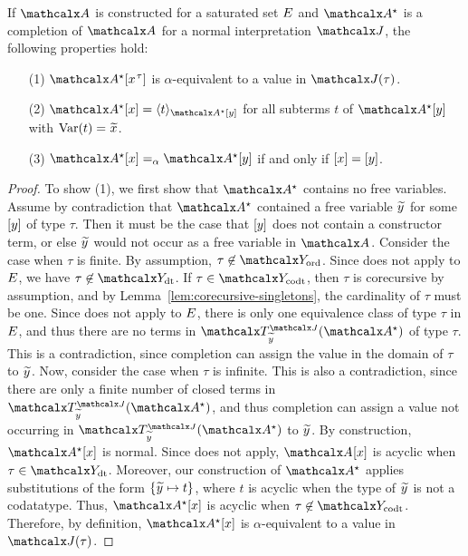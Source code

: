 \begin{lemma}
\label{lem:interpretation-completion}
If $\Val$ is constructed for a saturated set $E$
and $\ValC$ is a completion of $\Val$ for a normal interpretation $\J$, the following properties hold:
\begin{enumerate}
\item[\rm (1)] $\ValC \ec{x\typ{\tau}}$ is $\alpha$-equivalent to a value in $\J( \tau )$.
\item[\rm (2)]
$\ValC \ec{x} = \interp{\ValC \ec{y}}{ t }$ for
all subterms $t$ of $\ValC \ec{y}$ with $\muvar(t) = {\Varec{x}}$.
\item[\rm (3)]
$\ValC \ec{x} \vsim \ValC \ec{y}$ if and only if $[x] = [y]$.
\end{enumerate}
\end{lemma}
\begin{rep}
\begin{proof}
To show (1), we first show that $\ValC$ contains no free variables.
Assume by contradiction that $\ValC$ contained a free variable ${\Varec{y}}$ for some $[y]$ of type $\tau$.
Then it must be the case that $[y]$ does not contain a constructor term,
or else ${\Varec{y}}$ would not occur as a free variable in $\Val$.
Consider the case when $\tau$ is finite.
By assumption, $\tau \not\in \Nondata$.
Since  does not apply to $E$, we have $\tau \not\in \Data$.
If $\tau \in \Codata$, then $\tau$ is corecursive by assumption, and by Lemma~\ref{lem:corecursive-singletons},
the cardinality of $\tau$ must be one.
Since  does not apply to $E$,
there is only one equivalence class of type $\tau$ in $E$,
and thus there are no terms in $\Terms^{\smash{\J}}_{\Varec{y}}(\ValC)$ of type $\tau$.
This is a contradiction, since %
completion can assign the value in the domain of $\tau$ to ${\Varec{y}}$.
Now, consider the case when $\tau$ is infinite.
This is also a contradiction,
since there are only a finite number of closed terms in $\Terms^{\smash{\J}}_{\Varec{y}}(\ValC)$,
and thus %
completion can assign a value not occurring in $\Terms^{\smash{\J}}_{\Varec{y}}(\ValC)$ to ${\Varec{y}}$.
By construction, $\ValC \ec{x}$ is normal.
Since  does not apply, $\Val \ec{x}$ is acyclic when $\tau \in \Data$.
Moreover, our construction of $\ValC$ applies substitutions of the form
$\{ {\Varec{y}} \mapsto t \}$, where $t$ is acyclic when the type of ${\Varec{y}}$ is not a codatatype.
Thus, $\ValC \ec{x}$ is acyclic when $\tau \not\in \Codata$.
Therefore, by definition, $\ValC \ec{x}$ is $\alpha$-equivalent to a value in $\J( \tau )$.


\end{proof}
\end{rep}
